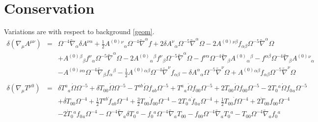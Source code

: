 \documentclass[10pt,letterpaper]{article}
\numberwithin{equation}{section}
\begin{document}
\section{Conservation}
Variations are with respect to background \eqref{geom}.
\begin{eqnarray}
\delta(\nabla_\mu A^{\mu\nu})&=& \Omega^{-4} \tilde{\nabla}_{\alpha }\delta A^{\nu \alpha } + \tfrac{1}{2} A^{(0)}{}^{\nu }{}_{\alpha } \Omega^{-4} \tilde{\nabla}^{\alpha }f + 2 \delta A^{\nu }{}_{\alpha } \Omega^{-5} \tilde{\nabla}^{\alpha }\Omega - 2 A^{(0)}{}^{\nu \beta } f_{\alpha \beta } \Omega^{-5} \tilde{\nabla}^{\alpha }\Omega \nonumber \\ 
&& + A^{(0)}{}^{\beta }{}_{\beta } f^{\nu }{}_{\alpha } \Omega^{-5} \tilde{\nabla}^{\alpha }\Omega - 2 A^{(0)}{}_{\alpha }{}^{\beta } f^{\nu }{}_{\beta } \Omega^{-5} \tilde{\nabla}^{\alpha }\Omega -  f^{\nu \alpha } \Omega^{-4} \tilde{\nabla}_{\beta }A^{(0)}{}_{\alpha }{}^{\beta } -  f^{\alpha \beta } \Omega^{-4} \tilde{\nabla}_{\beta }A^{(0)}{}^{\nu }{}_{\alpha } \nonumber \\ 
&& -  A^{(0)}{}^{\nu \alpha } \Omega^{-4} \tilde{\nabla}_{\beta }f_{\alpha }{}^{\beta } -  \tfrac{1}{2} A^{(0)}{}^{\alpha \beta } \Omega^{-4} \tilde{\nabla}^{\nu }f_{\alpha \beta } -  \delta A^{\alpha }{}_{\alpha } \Omega^{-5} \tilde{\nabla}^{\nu }\Omega + A^{(0)}{}^{\alpha \beta } f_{\alpha \beta } \Omega^{-5} \tilde{\nabla}^{\nu }\Omega 
\\ \nonumber\\
\delta(\nabla_\mu T^{\mu 0})&=& \delta T^{a}{}_{a} \dot{\Omega} \Omega^{-5} + \delta T_{00}{} \dot{\Omega} \Omega^{-5} -  T^{ab} \dot{\Omega} f_{ab} \Omega^{-5} + T^{a}{}_{a} \dot{\Omega} f_{00}{} \Omega^{-5} + 2 T_{00}{} \dot{\Omega} f_{00}{} \Omega^{-5} - 2 T_{0}{}^{a} \dot{\Omega} f_{0}{}_{a} \Omega^{-5} \nonumber \\ 
&& + \dot{\delta T}_{00}{} \Omega^{-4} + \tfrac{1}{2} T^{ab} \dot{f}_{ab} \Omega^{-4} + \tfrac{3}{2} T_{00}{} \dot{f}_{00}{} \Omega^{-4} - 2 T_{0}{}^{a} \dot{f}_{0}{}_{a} \Omega^{-4} + \tfrac{1}{2} T_{00}{} \dot{f} \Omega^{-4} + 2 \dot{T}_{00}{} f_{00}{} \Omega^{-4} \nonumber \\ 
&& - 2 \dot{T}_{0}{}^{a} f_{0}{}_{a} \Omega^{-4} -  \Omega^{-4} \tilde{\nabla}_{a}\delta T_{0}{}^{a} -  f_{0}{}^{a} \Omega^{-4} \tilde{\nabla}_{a}T_{00}{} -  f_{00}{} \Omega^{-4} \tilde{\nabla}_{a}T_{0}{}^{a} -  T_{00}{} \Omega^{-4} \tilde{\nabla}_{a}f_{0}{}^{a} \nonumber \\ 

\end{eqnarray}
\end{document}
